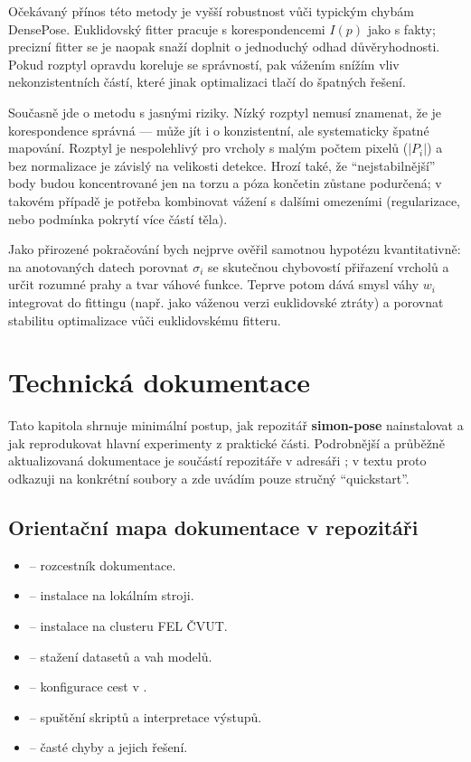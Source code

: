 \documentclass[11pt,a4paper,twoside,openright]{report}
\begin{document}
Očekávaný přínos této metody je vyšší robustnost vůči typickým chybám DensePose. Euklidovský fitter pracuje s korespondencemi $I(p)$ jako s fakty; precizní fitter se je naopak snaží doplnit o jednoduchý odhad důvěryhodnosti. Pokud rozptyl opravdu koreluje se správností, pak vážením snížím vliv nekonzistentních částí, které jinak optimalizaci tlačí do špatných řešení.

Současně jde o metodu s jasnými riziky. Nízký rozptyl nemusí znamenat, že je korespondence správná --- může jít i o konzistentní, ale systematicky špatné mapování. Rozptyl je nespolehlivý pro vrcholy s malým počtem pixelů ($|P_i|$) a bez normalizace je závislý na velikosti detekce. Hrozí také, že \enquote{nejstabilnější} body budou koncentrované jen na torzu a póza končetin zůstane podurčená; v takovém případě je potřeba kombinovat vážení s dalšími omezeními (regularizace, nebo podmínka pokrytí více částí těla).

Jako přirozené pokračování bych nejprve ověřil samotnou hypotézu kvantitativně: na anotovaných datech porovnat $\sigma_i$ se skutečnou chybovostí přiřazení vrcholů a určit rozumné prahy a tvar váhové funkce. Teprve potom dává smysl váhy $w_i$ integrovat do fittingu (např. jako váženou verzi euklidovské ztráty) a porovnat stabilitu optimalizace vůči euklidovskému fitteru.

\chapter{Technická dokumentace}

Tato kapitola shrnuje minimální postup, jak repozitář \textbf{simon-pose} nainstalovat a jak reprodukovat hlavní experimenty z praktické části. Podrobnější a průběžně aktualizovaná dokumentace je součástí repozitáře v adresáři ; v textu proto odkazuji na konkrétní soubory a zde uvádím pouze stručný \enquote{quickstart}.

\section{Orientační mapa dokumentace v repozitáři}

\begin{itemize}
    \item {} -- rozcestník dokumentace.
    \item {} -- instalace na lokálním stroji.
    \item {} -- instalace na clusteru FEL ČVUT.
    \item {} -- stažení datasetů a vah modelů.
    \item {} -- konfigurace cest v .
    \item {} -- spuštění skriptů a interpretace výstupů.
    \item {} -- časté chyby a jejich řešení.
\end{itemize}
\end{document}
